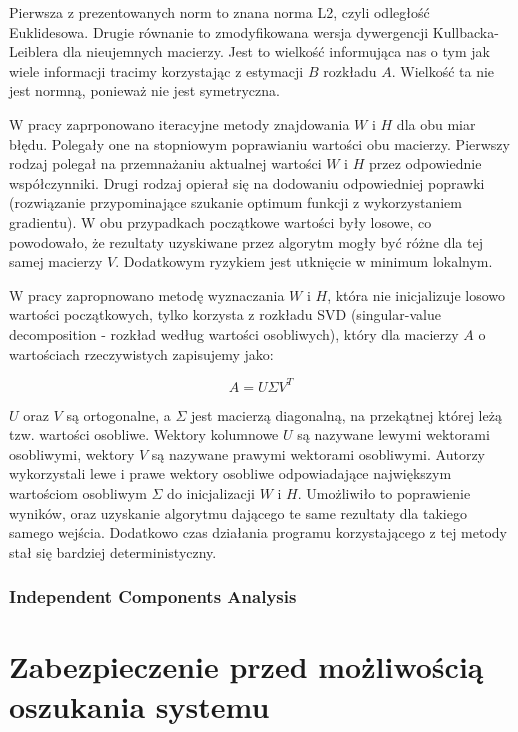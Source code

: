 \documentclass[oneside, eng]{mgr}
\begin{document}
Pierwsza z prezentowanych norm to znana norma L2, czyli odległość Euklidesowa. Drugie równanie to zmodyfikowana wersja dywergencji Kullbacka-Leiblera dla nieujemnych macierzy. Jest to wielkość informująca nas o tym jak wiele informacji tracimy korzystając z estymacji $B$ rozkładu $A$. Wielkość ta nie jest normną, ponieważ nie jest symetryczna.

W pracy \cite{NMF} zaprponowano iteracyjne metody znajdowania $W$ i $H$ dla obu miar błędu. Polegały one na stopniowym poprawianiu wartości obu macierzy. Pierwszy rodzaj polegał na przemnażaniu aktualnej wartości $W$ i $H$ przez odpowiednie współczynniki. Drugi rodzaj opierał się na dodowaniu odpowiedniej poprawki (rozwiązanie przypominające szukanie optimum funkcji z wykorzystaniem gradientu). W obu przypadkach początkowe wartości były losowe, co powodowało, że rezultaty uzyskiwane przez algorytm mogły być różne dla tej samej macierzy $V$. Dodatkowym ryzykiem jest utknięcie w minimum lokalnym.

W pracy \cite{NMF_SVD} zapropnowano metodę wyznaczania $W$ i $H$, która nie inicjalizuje losowo wartości początkowych, tylko korzysta z rozkładu SVD (singular-value decomposition - rozkład według wartości osobliwych), który dla macierzy $A$ o wartościach rzeczywistych zapisujemy jako:

\begin{equation}
	A = U \Sigma V^T
\end{equation}

$U$ oraz $V$ są ortogonalne, a $\Sigma$ jest macierzą diagonalną, na przekątnej której leżą tzw. wartości osobliwe. Wektory kolumnowe $U$ są nazywane lewymi wektorami osobliwymi, wektory $V$ są nazywane prawymi wektorami osobliwymi. Autorzy \cite{NMF_SVD} wykorzystali lewe i prawe wektory osobliwe odpowiadające największym wartościom osobliwym $\Sigma$ do inicjalizacji $W$ i $H$. Umożliwiło to poprawienie wyników, oraz uzyskanie algorytmu dającego te same rezultaty dla takiego samego wejścia. Dodatkowo czas działania programu korzystającego z tej metody stał się bardziej deterministyczny.

\subsection{Independent Components Analysis}



\newpage

\chapter{Zabezpieczenie przed możliwością oszukania systemu}
\end{document}
